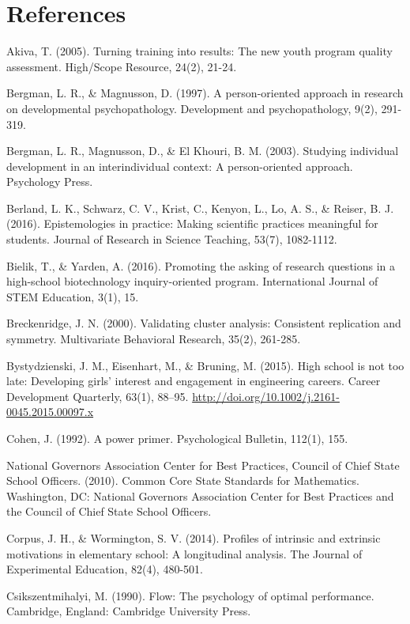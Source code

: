 \documentclass[]{msu-thesis}
\theoremstyle{definition}
\theoremstyle{definition}
\theoremstyle{definition}
\theoremstyle{remark}
\begin{document}
\chapter{References}\label{references}

\setlength{\parindent}{-0.2in} \setlength{\leftskip}{0.2in}
\setlength{\parskip}{8pt} \noindent

Akiva, T. (2005). Turning training into results: The new youth program
quality assessment. High/Scope Resource, 24(2), 21-24.

Bergman, L. R., \& Magnusson, D. (1997). A person-oriented approach in
research on developmental psychopathology. Development and
psychopathology, 9(2), 291-319.

Bergman, L. R., Magnusson, D., \& El Khouri, B. M. (2003). Studying
individual development in an interindividual context: A person-oriented
approach. Psychology Press.

Berland, L. K., Schwarz, C. V., Krist, C., Kenyon, L., Lo, A. S., \&
Reiser, B. J. (2016). Epistemologies in practice: Making scientific
practices meaningful for students. Journal of Research in Science
Teaching, 53(7), 1082-1112.

Bielik, T., \& Yarden, A. (2016). Promoting the asking of research
questions in a high-school biotechnology inquiry-oriented program.
International Journal of STEM Education, 3(1), 15.

Breckenridge, J. N. (2000). Validating cluster analysis: Consistent
replication and symmetry. Multivariate Behavioral Research, 35(2),
261-285.

Bystydzienski, J. M., Eisenhart, M., \& Bruning, M. (2015). High school
is not too late: Developing girls' interest and engagement in
engineering careers. Career Development Quarterly, 63(1), 88--95.
\url{http://doi.org/10.1002/j.2161-0045.2015.00097.x}

Cohen, J. (1992). A power primer. Psychological Bulletin, 112(1), 155.

National Governors Association Center for Best Practices, Council of
Chief State School Officers. (2010). Common Core State Standards for
Mathematics. Washington, DC: National Governors Association Center for
Best Practices and the Council of Chief State School Officers.

Corpus, J. H., \& Wormington, S. V. (2014). Profiles of intrinsic and
extrinsic motivations in elementary school: A longitudinal analysis. The
Journal of Experimental Education, 82(4), 480-501.

Csikszentmihalyi, M. (1990). Flow: The psychology of optimal
performance. Cambridge, England: Cambridge University Press.
\end{document}
